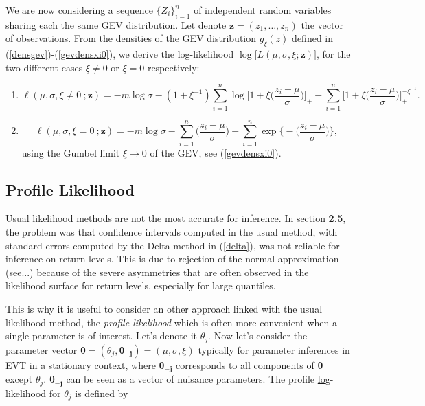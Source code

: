 \documentclass[11pt,a4paper,openany ]{book}
\begin{document}
We are now considering a sequence $\{Z_i\}_{i=1}^n$ of independent random variables sharing 
each the same GEV distribution. Let denote $\boldsymbol{z}=(z_1,\dots,z_n)$ the vector of 
observations.
From the densities of the GEV distribution $g_{\xi}(z)$ defined in 
(\ref{densgev})-(\ref{gevdensxi0}), we derive the log-likelihood 
$\log\big[L(\mu,\sigma,\xi;\boldsymbol{z})\big]$, for the two different cases $\xi\neq 0$ 
or $\xi=0$ respectively:


\begin{enumerate}
	\item \begin{equation} \label{llik12}
	\ell(\mu,\sigma,\xi\neq 0\ ;\textbf{z})= 
	-m\log\sigma-(1+\xi^{-1})\sum_{i=1}^n\log\bigg[1+\xi\bigg(\frac{z_i-\mu}{\sigma}\bigg)\bigg]_+-\sum_{i=1}^n\bigg[1+\xi\bigg(\frac{z_i-\mu}{\sigma}\bigg)\bigg]_+^{-\xi^{-1}}.
	\end{equation}
	
	
	
	\item \begin{equation} \label{llik0}
	\ell(\mu,\sigma,\xi=0\ ;\textbf{z})=-m\log 
	\sigma-\sum_{i=1}^n\bigg(\frac{z_i-\mu}{\sigma}\bigg)-\sum_{i=1}^{n}\exp\bigg\{-\bigg(\frac{z_i-\mu}{\sigma}\bigg)\bigg\},
	\end{equation}
	using the Gumbel limit $\xi\rightarrow 0$ of the GEV, see (\ref{gevdensxi0}).
\end{enumerate}


\subsection*{Profile Likelihood}

Usual likelihood methods are not the most accurate for inference. In section \textbf{2.5}, 
the problem was that confidence intervals computed in the usual method, with standard 
errors computed by the Delta method in (\ref{delta}), was not reliable for inference on 
return levels. This is due to rejection of the normal approximation (see...) because of the 
severe asymmetries that are often observed in the likelihood surface for return levels, 
especially for large quantiles.
\cite{bolivar_profile_2010}

This is why it is useful to consider an other approach linked with the usual likelihood method, the \emph{profile likelihood} which is often more convenient when a single parameter is of interest. Let's denote it $\theta_j$. Now let's consider the parameter vector $\boldsymbol{\theta}=(\theta_j,\boldsymbol{\theta_{-j}})= (\mu,\sigma,\xi)$ typically for parameter inferences in EVT in a stationary context, where $\boldsymbol{\theta_{-j}}$ corresponds to all components of $\boldsymbol{\theta}$ except $\theta_j$. $\boldsymbol{\theta_{-j}}$ can be seen as a vector of nuisance parameters.
The profile \underline{log}-likelihood for $\theta_j$ is defined by 
\end{document}
